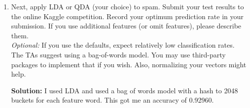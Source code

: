 \documentclass{article}
\newcommand{\solution}{\textbf{Solution: }}
\begin{document}
\begin{enumerate}[label=(\alph*)]
\begin{enumerate}[label=(\roman*)]
    \end{enumerate}
    \item Next, apply LDA or QDA (your choice) to spam. Submit your test results to the online Kaggle competition. Record your optimum prediction rate in your submission. If you use additional features (or omit features), please describe them. \\
    
    \emph{Optional:} If you use the defaults, expect relatively low classification rates. The TAs suggest using a bag-of-words model. You may use third-party packages to implement that if you wish. Also, normalizing your vectors might help.
    
    \begin{mdframed} \solution
    I used LDA and used a bag of words model with a hash to 2048 buckets for each feature word. This got me an accuracy of 0.92960.
    \end{mdframed}
\end{enumerate}

\newpage
\end{document}
